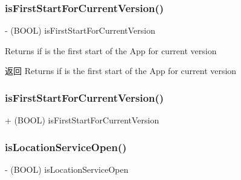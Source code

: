 \subsubsection{\texorpdfstring{is\+First\+Start\+For\+Current\+Version()}{isFirstStartForCurrentVersion()}\hspace{0.1cm}{\footnotesize\ttfamily [1/2]}}
{\footnotesize\ttfamily -\/ (B\+O\+OL) is\+First\+Start\+For\+Current\+Version \begin{DoxyParamCaption}{ }\end{DoxyParamCaption}}

Returns if is the first start of the App for current version

\begin{DoxyReturn}{返回}
Returns if is the first start of the App for current version 
\end{DoxyReturn}
\mbox{\label{interface_m_a_r_global_manager_ab111e5c33b73bd47237c0006b532655b}} 
\subsubsection{\texorpdfstring{is\+First\+Start\+For\+Current\+Version()}{isFirstStartForCurrentVersion()}\hspace{0.1cm}{\footnotesize\ttfamily [2/2]}}
{\footnotesize\ttfamily + (B\+O\+OL) is\+First\+Start\+For\+Current\+Version \begin{DoxyParamCaption}{ }\end{DoxyParamCaption}}

\mbox{\label{interface_m_a_r_global_manager_a0ef739e91af348c99ffff1506204e70a}} 
\subsubsection{\texorpdfstring{is\+Location\+Service\+Open()}{isLocationServiceOpen()}}
{\footnotesize\ttfamily -\/ (B\+O\+OL) is\+Location\+Service\+Open \begin{DoxyParamCaption}{ }\end{DoxyParamCaption}}

